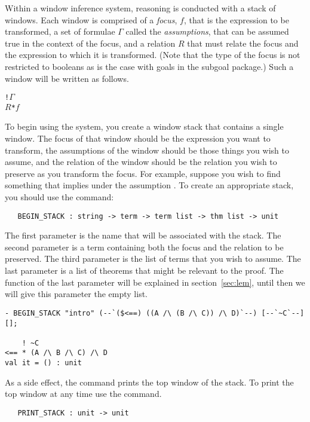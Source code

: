 Within a window inference system,
    reasoning is conducted with a stack of windows.
Each window is comprised of a {\it focus},
$f$, that is the expression to be transformed,
a set of formulae $\Gamma$ called the {\it assumptions},
that can be assumed true in the context of the focus, and a
relation $R$\/ that
must relate the focus and the expression to which it is transformed.
(Note that the type of the focus is not restricted to booleans as is the
case with goals in the subgoal package.)
Such a window will be written as follows.
\begin{hol}\begin{alltt}
     ! \(\Gamma\)
   \(R\!\) * \(f\)
\end{alltt}\end{hol}

To begin using the system,
you create a window stack that contains a single window.
The focus of that window should be the expression you want to transform,
the assumptions of the window should be those things you wish to assume,
and the relation of the window should be 
the relation you wish to preserve as you transform the focus.
For example, suppose you wish to find something that implies
 under the assumption .
To create an appropriate stack, you should use the command:
\begin{boxed}\begin{verbatim}
   BEGIN_STACK : string -> term -> term list -> thm list -> unit
\end{verbatim}\end{boxed}
The first parameter is the name that will be associated with the stack.
The second parameter is a term containing both the focus and the relation
to be preserved.
The third parameter is the list of terms that you wish to assume.
The last parameter is a list of theorems that might be relevant to the proof.
The function of the last parameter will be explained in section~\ref{sec:lem},
until then we will give this parameter the empty list.
\setcounter{sessioncount}{1}
\begin{session}\begin{verbatim}
- BEGIN_STACK "intro" (--`($<==) ((A /\ (B /\ C)) /\ D)`--) [--`~C`--] [];

    ! ~C
<== * (A /\ B /\ C) /\ D
val it = () : unit
\end{verbatim}\end{session}
As a side effect, the
command prints the top window of the stack.
To print the top window at any time use the
command.
\begin{boxed}\begin{verbatim}
   PRINT_STACK : unit -> unit
\end{verbatim}\end{boxed}

